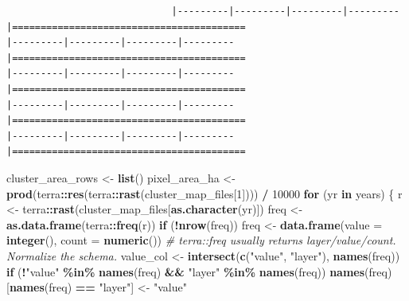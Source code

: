\documentclass[
]{article}
\newenvironment{Shaded}{\begin{snugshade}}{\end{snugshade}}
\newcommand{\AttributeTok}[1]{\textcolor[rgb]{0.13,0.29,0.53}{#1}}
\newcommand{\CommentTok}[1]{\textcolor[rgb]{0.56,0.35,0.01}{\textit{#1}}}
\newcommand{\ControlFlowTok}[1]{\textcolor[rgb]{0.13,0.29,0.53}{\textbf{#1}}}
\newcommand{\DecValTok}[1]{\textcolor[rgb]{0.00,0.00,0.81}{#1}}
\newcommand{\FunctionTok}[1]{\textcolor[rgb]{0.13,0.29,0.53}{\textbf{#1}}}
\newcommand{\NormalTok}[1]{#1}
\newcommand{\OtherTok}[1]{\textcolor[rgb]{0.56,0.35,0.01}{#1}}
\newcommand{\SpecialCharTok}[1]{\textcolor[rgb]{0.81,0.36,0.00}{\textbf{#1}}}
\newcommand{\StringTok}[1]{\textcolor[rgb]{0.31,0.60,0.02}{#1}}
\begin{document}
\begin{verbatim}
                             |---------|---------|---------|---------|=========================================                                          |---------|---------|---------|---------|=========================================                                          |---------|---------|---------|---------|=========================================                                          |---------|---------|---------|---------|=========================================                                          |---------|---------|---------|---------|=========================================                                          
\end{verbatim}

\begin{Shaded}
\begin{Highlighting}[]
\NormalTok{cluster\_area\_rows }\OtherTok{\textless{}{-}} \FunctionTok{list}\NormalTok{()}
\NormalTok{pixel\_area\_ha }\OtherTok{\textless{}{-}} \FunctionTok{prod}\NormalTok{(terra}\SpecialCharTok{::}\FunctionTok{res}\NormalTok{(terra}\SpecialCharTok{::}\FunctionTok{rast}\NormalTok{(cluster\_map\_files[}\DecValTok{1}\NormalTok{]))) }\SpecialCharTok{/} \DecValTok{10000}
\ControlFlowTok{for}\NormalTok{ (yr }\ControlFlowTok{in}\NormalTok{ years) \{}
\NormalTok{  r }\OtherTok{\textless{}{-}}\NormalTok{ terra}\SpecialCharTok{::}\FunctionTok{rast}\NormalTok{(cluster\_map\_files[}\FunctionTok{as.character}\NormalTok{(yr)])}
\NormalTok{  freq }\OtherTok{\textless{}{-}} \FunctionTok{as.data.frame}\NormalTok{(terra}\SpecialCharTok{::}\FunctionTok{freq}\NormalTok{(r))}
  \ControlFlowTok{if}\NormalTok{ (}\SpecialCharTok{!}\FunctionTok{nrow}\NormalTok{(freq)) freq }\OtherTok{\textless{}{-}} \FunctionTok{data.frame}\NormalTok{(}\AttributeTok{value =} \FunctionTok{integer}\NormalTok{(), }\AttributeTok{count =} \FunctionTok{numeric}\NormalTok{())}
  \CommentTok{\# terra::freq usually returns layer/value/count. Normalize the schema.}
\NormalTok{  value\_col }\OtherTok{\textless{}{-}} \FunctionTok{intersect}\NormalTok{(}\FunctionTok{c}\NormalTok{(}\StringTok{"value"}\NormalTok{, }\StringTok{"layer"}\NormalTok{), }\FunctionTok{names}\NormalTok{(freq))}
  \ControlFlowTok{if}\NormalTok{ (}\SpecialCharTok{!}\StringTok{"value"} \SpecialCharTok{\%in\%} \FunctionTok{names}\NormalTok{(freq) }\SpecialCharTok{\&\&} \StringTok{"layer"} \SpecialCharTok{\%in\%} \FunctionTok{names}\NormalTok{(freq)) }\FunctionTok{names}\NormalTok{(freq)[}\FunctionTok{names}\NormalTok{(freq) }\SpecialCharTok{==} \StringTok{"layer"}\NormalTok{] }\OtherTok{\textless{}{-}} \StringTok{"value"}

\end{Highlighting}
\end{Shaded}
\end{document}
